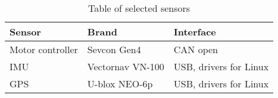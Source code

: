 \begin{table}[H]
	\centering
	\caption{Table of selected sensors}
	\label{tab:sensor_conclusion}
	\begin{tabular}{|l|l|l|}
		\hline
		\textbf{Sensor} & \textbf{Brand} & \textbf{Interface} \\
		\hline
		Motor controller & Sevcon Gen4 & CAN open \\ 
		\hline
		IMU & Vectornav VN-100 & USB, drivers for Linux\\
		\hline
		GPS & U-blox NEO-6p & USB, drivers for Linux\\
		\hline
	\end{tabular}
\end{table}
